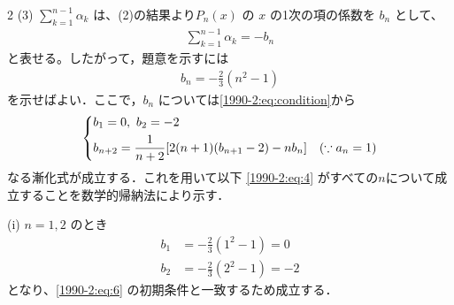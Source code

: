 \documentclass[../../main.tex]{subfiles}
\begin{document}
\begin{multicols}{2}
  \vspace{10pt}
  (3)
  $\displaystyle \sum_{k=1}^{n-1} \alpha_k$ は、(2)の結果より$P_n(x)$ の $x$ の1次の項の係数を $b_n$ として、
  \begin{align}\label{1990-2:eq:5}
    \sum_{k=1}^{n-1} \alpha_k = -b_n
  \end{align}
  と表せる。したがって，題意を示すには
  \begin{align}\label{1990-2:eq:4}
    b_n = -\frac{2}{3}(n^2 - 1)
  \end{align}
  を示せばよい．ここで，$b_n$ については\cref{1990-2:eq:condition}から
  \begin{align}\label{1990-2:eq:6}
    \begin{dcases}
      b_1 = 0, \ b_2 = -2 \\
      b_{n+2} = \frac{1}{n+2} [2(n+1)(b_{n+1} - 2) - n b_n] \quad (\because a_n=1)
    \end{dcases}
  \end{align}
  なる漸化式が成立する．これを用いて以下 \cref{1990-2:eq:4} がすべての$n$について成立することを数学的帰納法により示す．

  \vspace{10pt}
  (i) $n=1, 2$ のとき
  \begin{align*}
    b_1 & = -\frac{2}{3}(1^2-1) = 0  \\
    b_2 & = -\frac{2}{3}(2^2-1) = -2
  \end{align*}
  となり、\cref{1990-2:eq:6} の初期条件と一致するため成立する．


\end{multicols}
\end{document}
